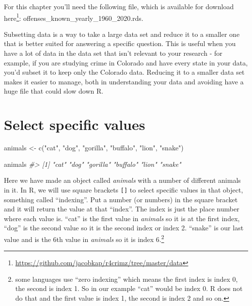 \documentclass[
]{krantz}
\makeatletter
\newenvironment{Shaded}{\begin{snugshade}}{\end{snugshade}}
\newcommand{\CommentTok}[1]{\textcolor[rgb]{0.37,0.37,0.37}{\textit{#1}}}
\newcommand{\FunctionTok}[1]{\textcolor[rgb]{0,0,0}{#1}}
\newcommand{\NormalTok}[1]{#1}
\newcommand{\OtherTok}[1]{\textcolor[rgb]{0.37,0.37,0.37}{#1}}
\newcommand{\StringTok}[1]{\textcolor[rgb]{0.5,0.5,0.5}{#1}}
\renewcommand{\href}[2]{#2\footnote{\url{#1}}}
\newenvironment{kframe}{%
\medskip{}
\setlength{\fboxsep}{.8em}
 \def\at@end@of@kframe{}%
 \ifinner\ifhmode%
  \def\at@end@of@kframe{\end{minipage}}%
  \begin{minipage}{\columnwidth}%
 \fi\fi%
 \def\FrameCommand##1{\hskip\@totalleftmargin \hskip-\fboxsep
 \colorbox{shadecolor}{##1}\hskip-\fboxsep
     \hskip-\linewidth \hskip-\@totalleftmargin \hskip\columnwidth}%
 \MakeFramed {\advance\hsize-\width
   \@totalleftmargin\z@ \linewidth\hsize
   \@setminipage}}%
 {\par\unskip\endMakeFramed%
 \at@end@of@kframe}
\renewenvironment{Shaded}{\begin{kframe}}{\end{kframe}}
\makeatother
\begin{document}
For this chapter you'll need the following file, which is available for download \href{https://github.com/jacobkap/r4crimz/tree/master/data}{here}: offenses\_known\_yearly\_1960\_2020.rds.

Subsetting data is a way to take a large data set and reduce it to a smaller one that is better suited for answering a specific question. This is useful when you have a lot of data in the data set that isn't relevant to your research - for example, if you are studying crime in Colorado and have every state in your data, you'd subset it to keep only the Colorado data. Reducing it to a smaller data set makes it easier to manage, both in understanding your data and avoiding have a huge file that could slow down R.

\hypertarget{select-specific-values}{%
\section{Select specific values}\label{select-specific-values}}

\begin{Shaded}
\begin{Highlighting}[]
\NormalTok{animals }\OtherTok{\textless{}{-}} \FunctionTok{c}\NormalTok{(}\StringTok{"cat"}\NormalTok{, }\StringTok{"dog"}\NormalTok{, }\StringTok{"gorilla"}\NormalTok{, }\StringTok{"buffalo"}\NormalTok{, }\StringTok{"lion"}\NormalTok{, }\StringTok{"snake"}\NormalTok{)}
\end{Highlighting}
\end{Shaded}

\begin{Shaded}
\begin{Highlighting}[]
\NormalTok{animals}
\CommentTok{\#\textgreater{} [1] "cat"     "dog"     "gorilla" "buffalo" "lion"    "snake"}
\end{Highlighting}
\end{Shaded}

Here we have made an object called \emph{animals} with a number of different animals in it. In R, we will use square brackets \texttt{{[}{]}} to select specific values in that object, something called ``indexing''. Put a number (or numbers) in the square bracket and it will return the value at that ``index''. The index is just the place number where each value is. ``cat'' is the first value in \emph{animals} so it is at the first index, ``dog'' is the second value so it is the second index or index 2. ``snake'' is our last value and is the 6th value in \emph{animals} so it is index 6.\footnote{some languages use ``zero indexing'' which means the first index is index 0, the second is index 1. So in our example ``cat'' would be index 0. R does not do that and the first value is index 1, the second is index 2 and so on.}
\end{document}

